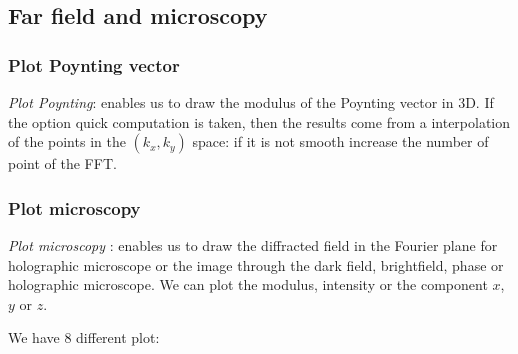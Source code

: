 \subsection{Far field and microscopy}

\subsubsection{Plot Poynting vector}

{\it Plot Poynting}: enables us to draw the modulus of the Poynting
vector in 3D. If the option quick computation is taken, then the
results come from a interpolation of the points in the $(k_x,k_y)$
space: if it is not smooth increase the number of point of the FFT.

\subsubsection{Plot microscopy}

{\it Plot microscopy} : enables us to draw the diffracted field in the
Fourier plane for holographic microscope or the image through the dark
field, brightfield, phase or holographic microscope. We can plot the
modulus, intensity or the component $x$, $y$ or $z$.


We have 8 different plot:

